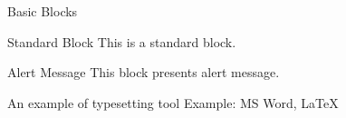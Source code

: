 
\begin{frame}{Basic Blocks}
    \begin{block}{Standard Block}
        This is a standard block.
    \end{block}

    \begin{alertblock}{Alert Message}
        This block presents alert message.
    \end{alertblock}

    \begin{exampleblock}{An example of typesetting tool}
        Example: MS Word, \LaTeX{}
    \end{exampleblock}
\end{frame}

